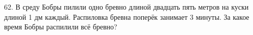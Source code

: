 62. В среду Бобры пилили одно бревно длиной двадцать пять метров на куски длиной 1 дм каждый. Распиловка бревна поперёк занимает 3 минуты. За какое время Бобры распилили всё бревно?\\
